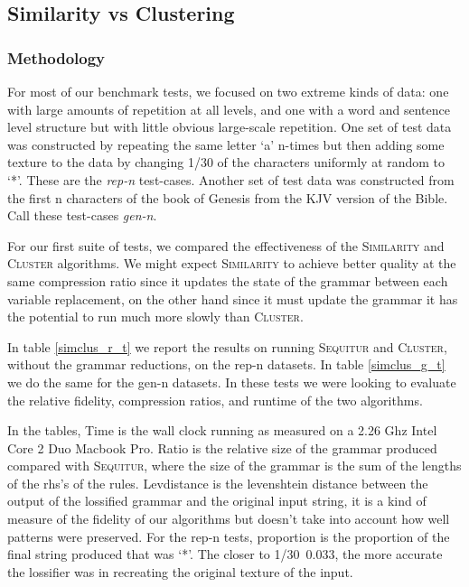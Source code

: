 \documentclass[11pt]{article}
\newcommand{\Sequitur}{\textsc{Sequitur}\xspace}
\newcommand{\Similarity}{\textsc{Similarity}\xspace}
\newcommand{\Cluster}{\textsc{Cluster}\xspace}
\begin{document}
\subsection{Similarity vs Clustering}

\subsubsection{Methodology}

For most of our benchmark tests, we focused on two extreme kinds of data: one
with large amounts of repetition at all levels, and one with a word and
sentence level structure but with little obvious large-scale repetition.  One
set of test data was constructed by repeating the same letter `a' n-times but
then adding some texture to the data by changing 1/30 of the characters
uniformly at random to `*'. These are the \emph{rep-n} test-cases.
Another set of
test data was constructed from the first n characters of the book of Genesis
from the KJV version of the Bible. Call these test-cases \emph{gen-n}.

For our first suite of tests, we compared the effectiveness of the
\Similarity and \Cluster algorithms. We might expect \Similarity to
achieve better quality at the same compression ratio since it updates the state
of the grammar between each variable replacement, on the other hand since it
must update the grammar it has the potential to run much more slowly than
\Cluster. 

In table \ref{simclus_r_t} we report the results on running \Sequitur and
\Cluster, without the grammar reductions, on the rep-n datasets. In table
\ref{simclus_g_t} we do the same for the gen-n datasets.
In these tests
we were looking to evaluate the relative fidelity, compression ratios, and runtime 
of the two algorithms.

In the tables, Time is the
wall clock running as measured on a 2.26 Ghz Intel Core 2 Duo Macbook Pro.
Ratio is the relative size of the grammar produced compared with \Sequitur,
where the size of the grammar is the sum of the lengths of the rhs's of the
rules. Levdistance is the levenshtein distance between the output of the
lossified grammar and the original input string, it is a kind of measure of the
fidelity of our algorithms but doesn't take into account how well patterns were
preserved. For the rep-n tests, proportion is the proportion of the final
string produced that was `*'. The closer to 1/30~0.033, the more accurate the
lossifier was in recreating the original texture of the input.
\end{document}
